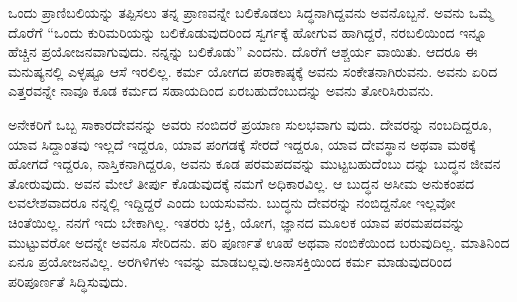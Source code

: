 ಒಂದು ಪ್ರಾಣಿಬಲಿಯನ್ನು ತಪ್ಪಿಸಲು ತನ್ನ ಪ್ರಾಣವನ್ನೇ ಬಲಿಕೊಡಲು ಸಿದ್ಧನಾಗಿದ್ದ\-ವನು ಅವನೊಬ್ಬನೆ. ಅವನು ಒಮ್ಮೆ ದೊರೆಗೆ “ಒಂದು ಕುರಿಮರಿಯನ್ನು ಬಲಿಕೊಡುವುದರಿಂದ ಸ್ವರ್ಗಕ್ಕೆ ಹೋಗುವ ಹಾಗಿದ್ದರೆ, ನರಬಲಿಯಿಂದ ಇನ್ನೂ ಹೆಚ್ಚಿನ ಪ್ರಯೋಜನ\break ವಾಗುವುದು. ನನ್ನನ್ನು ಬಲಿಕೊಡು” ಎಂದನು. ದೊರೆಗೆ ಆಶ್ಚರ್ಯ ವಾಯಿತು. ಆದರೂ ಈ ಮನುಷ್ಯನಲ್ಲಿ ಎಳ್ಳಷ್ಟೂ ಆಸೆ ಇರಲಿಲ್ಲ. ಕರ್ಮ ಯೋಗದ ಪರಾಕಾಷ್ಠಕ್ಕೆ ಅವನು ಸಂಕೇತನಾಗಿರುವನು. ಅವನು ಏರಿದ ಎತ್ತರವನ್ನೇ ನಾವೂ ಕೂಡ ಕರ್ಮದ ಸಹಾಯದಿಂದ ಏರಬಹುದೆಂಬುದನ್ನು ಅವನು ತೋರಿಸಿರುವನು.

ಅನೇಕರಿಗೆ ಒಬ್ಬ ಸಾಕಾರದೇವನನ್ನು ಅವರು ನಂಬಿದರೆ ಪ್ರಯಾಣ ಸುಲಭವಾಗು ವುದು. ದೇವರನ್ನು ನಂಬದಿದ್ದರೂ, ಯಾವ ಸಿದ್ದಾಂತವು ಇಲ್ಲದೆ ಇದ್ದರೂ, ಯಾವ ಪಂಗಡಕ್ಕೆ ಸೇರದೆ ಇದ್ದರೂ, ಯಾವ ದೇವಸ್ಥಾನ ಅಥವಾ ಮಠಕ್ಕೆ ಹೋಗದೆ ಇದ್ದರೂ, ನಾಸ್ತಿಕನಾಗಿದ್ದರೂ, ಅವನು ಕೂಡ ಪರಮಪದವನ್ನು ಮುಟ್ಟಬಹುದೆಂಬು ದನ್ನು ಬುದ್ಧನ ಜೀವನ ತೋರುವುದು. ಅವನ ಮೇಲೆ ತೀರ್ಪು ಕೊಡುವುದಕ್ಕೆ ನಮಗೆ ಅಧಿಕಾರವಿಲ್ಲ. ಆ ಬುದ್ಧನ ಅಸೀಮ ಅನುಕಂಪದ ಲವಲೇಶವಾದರೂ ನನ್ನಲ್ಲಿ ಇದ್ದಿದ್ದರೆ ಎಂದು ಬಯಸುವೆನು. ಬುದ್ಧನು ದೇವರನ್ನು ನಂಬಿದ್ದನೋ ಇಲ್ಲವೋ ಚಿಂತೆಯಿಲ್ಲ. ನನಗೆ ಇದು ಬೇಕಾಗಿಲ್ಲ. ಇತರರು ಭಕ್ತಿ, ಯೋಗ, ಜ್ಞಾನದ ಮೂಲಕ ಯಾವ ಪರಮಪದವನ್ನು ಮುಟ್ಟುವರೋ ಅದನ್ನೇ ಅವನೂ ಸೇರಿದನು. ಪರಿ ಪೂರ್ಣತೆ ಊಹೆ ಅಥವಾ ನಂಬಿಕೆಯಿಂದ ಬರುವುದಿಲ್ಲ. ಮಾತಿನಿಂದ ಏನೂ ಪ್ರಯೋಜನವಿಲ್ಲ. ಅರಗಿಳಿಗಳು ಇವನ್ನು ಮಾಡಬಲ್ಲವು.\break ಅನಾಸಕ್ತಿಯಿಂದ ಕರ್ಮ ಮಾಡುವುದರಿಂದ ಪರಿಪೂರ್ಣತೆ ಸಿದ್ಧಿಸುವುದು.

